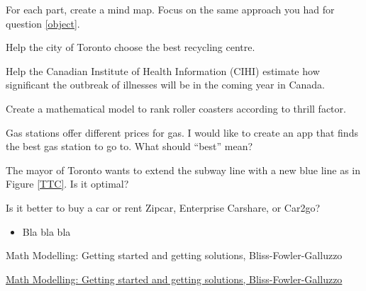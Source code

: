 For each part, create a mind map. Focus on the same approach you had for question \ref{object}.
\begin{parts}
	\item Help the city of Toronto choose the best recycling centre.
	\item Help the Canadian Institute of Health Information (CIHI) estimate how significant the outbreak of illnesses will be in the coming year in Canada.
	\item Create a mathematical model to rank roller coasters according to thrill factor.
	\item Gas stations offer different prices for gas. I would like to create an app that finds the best gas station to go to. What should ``best'' mean?
	\item The mayor of Toronto wants to extend the subway line with a new blue line as in Figure \ref{TTC}. Is it optimal?
	
	\item Is it better to buy a car or rent Zipcar, Enterprise Carshare, or Car2go?

	
\end{parts}








\begin{module}
	
	\begin{itemize}
		\item Bla bla bla	
	\end{itemize}
	


\begin{annotation}
	\begin{goals}
	Math Modelling: Getting started and getting solutions, Bliss-Fowler-Galluzzo
	
	\hfill {}	
	\end{goals}
\end{annotation}
	 \href{https://m3challenge.siam.org/resources/modeling-handbook}{Math Modelling: Getting started and getting solutions, Bliss-Fowler-Galluzzo}


\end{module}







